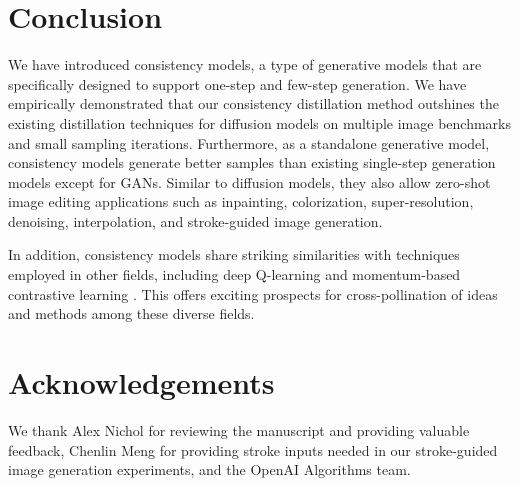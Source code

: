 \section{Conclusion}\label{sec:conclusion}
We have introduced consistency models, a type of generative models that are specifically designed to support one-step and few-step generation. We have empirically demonstrated that our consistency distillation method outshines the existing distillation techniques for diffusion models on multiple image benchmarks and small sampling iterations. Furthermore, as a standalone generative model, consistency models generate better samples than existing single-step generation models except for GANs. Similar to diffusion models, they also allow zero-shot image editing applications such as inpainting, colorization, super-resolution, denoising, interpolation, and stroke-guided image generation.

In addition, consistency models share striking similarities with techniques employed in other fields, including deep Q-learning \cite{mnih2015human} and momentum-based contrastive learning \cite{grill2020bootstrap,he2020momentum}. This offers exciting prospects for cross-pollination of ideas and methods among these diverse fields.

\section*{Acknowledgements}
We thank Alex Nichol for reviewing the manuscript and providing valuable feedback, Chenlin Meng for providing stroke inputs needed in our stroke-guided image generation experiments, and the OpenAI Algorithms team.
